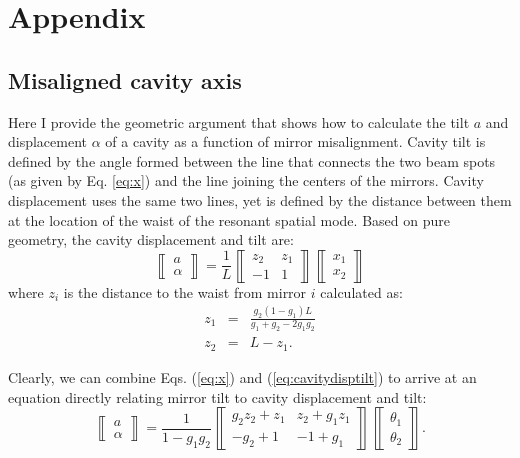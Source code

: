 \chapter{Appendix}

\section{Misaligned cavity axis}
\label{sec:misaligned_cavity}
Here I provide the geometric argument that shows how to calculate the
tilt $a$ and displacement $\alpha$ of a cavity as a function of mirror
misalignment. Cavity tilt is defined by the angle formed between
the line that connects the two beam spots (as given by Eq. \ref{eq:x}) and the line joining the
centers of the mirrors. Cavity displacement uses the same two lines,
yet is defined by the distance between them at the location of the
waist of the resonant spatial mode. Based on pure geometry, the cavity
displacement and tilt are:
\begin{equation}
\left\llbracket \begin{array}{c}
a \\
\alpha \end{array} \right\rrbracket = \frac{1}{L}
\left\llbracket \begin{array}{cc}
z_2 & z_1\\
-1 & 1\end{array} \right\rrbracket
\left\llbracket \begin{array}{c}
x_1\\
x_2 \end{array} \right\rrbracket
\label{eq:cavitydisptilt}
\end{equation}
where $z_i$ is the distance to the waist from mirror $i$ calculated as:
\begin{eqnarray}
z_1 &=& \frac{g_2 (1-g_1) L}{g_1+g_2 - 2 g_1g_2} \\
z_2 &=& L - z_1.
\end{eqnarray}

Clearly, we can combine Eqs. (\ref{eq:x}) and
(\ref{eq:cavitydisptilt}) to arrive at an equation directly relating
mirror tilt to cavity displacement and tilt: 
\begin{equation}
\left\llbracket \begin{array}{c}
a \\
\alpha \end{array} \right\rrbracket = \frac{1}{1-g_1g_2}
\left\llbracket \begin{array}{cc}
g_2z_2 + z_1 & z_2 + g_1z_1\\
-g_2 + 1 & -1 + g_1\end{array} \right\rrbracket
\left\llbracket \begin{array}{c}
\theta_1\\
\theta_2 \end{array} \right\rrbracket.
\label{eq:cavitydisptilt_mirrorangle}
\end{equation}



